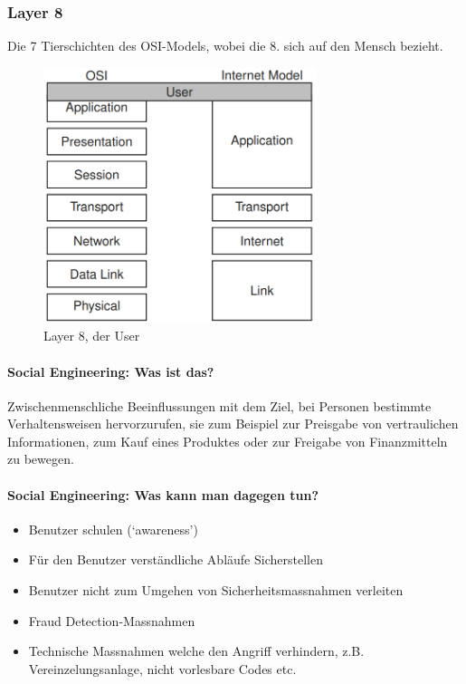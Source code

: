 \documentclass[10pt,a4paper]{article}
\begin{document}
\subsubsection*{Layer 8}
Die 7 Tierschichten des OSI-Models, wobei die 8. sich auf den Mensch bezieht.
\begin{figure}[H]
    \begin{center}
    \includegraphics[width=8cm]{images/Layer8.png}
    \caption{Layer 8, der User}
    \label{Layer 8}
    \end{center}
\end{figure}

\paragraph*{Social Engineering: Was ist das?}Zwischenmenschliche Beeinflussungen mit dem Ziel, bei
Personen bestimmte Verhaltensweisen hervorzurufen, sie zum
Beispiel zur Preisgabe von vertraulichen Informationen, zum
Kauf eines Produktes oder zur Freigabe von Finanzmitteln zu
bewegen.

\paragraph*{Social Engineering: Was kann man dagegen tun?}
\begin{itemize}[noitemsep,topsep=0pt,leftmargin=*]
    \item Benutzer schulen (`awareness')
    \item Für den Benutzer verständliche Abläufe Sicherstellen
    \item Benutzer nicht zum Umgehen von Sicherheitsmassnahmen verleiten
    \item Fraud Detection-Massnahmen
    \item Technische Massnahmen welche den Angriff verhindern, z.B. Vereinzelungsanlage, nicht vorlesbare Codes etc.
\end{itemize}
\end{document}
